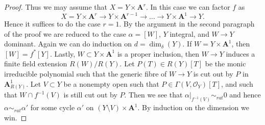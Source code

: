 \documentclass{amsart}
\theoremstyle{plain}
\theoremstyle{definition}
\theoremstyle{remark}
\numberwithin{equation}{subsection}
\begin{document}
\begin{proof}
\medskip\noindent
Thus we may assume that $X = Y \times \mathbf{A}^r$.
In this case we can factor $f$ as
$$
X = Y \times \mathbf{A}^r \to
Y \times \mathbf{A}^{r - 1} \to \ldots \to
Y \times \mathbf{A}^1 \to Y.
$$
Hence it suffices to do the case $r = 1$. By the argument in the
second paragraph of the proof we are reduced to the case
$\alpha = [W]$, $Y$ integral, and $W \to Y$ dominant.
Again we can do induction on $d = \dim_\delta(Y)$.
If $W = Y \times \mathbf{A}^1$, then $[W] = f^*[Y]$.
Lastly, $W \subset Y \times \mathbf{A}^1$ is a proper inclusion,
then $W \to Y$ induces a finite field extension $R(W)/R(Y)$.
Let $P(T) \in R(Y)[T]$ be the monic irreducible polynomial such
that the generic fibre of $W \to Y$ is cut out by $P$ in
$\mathbf{A}^1_{R(Y)}$. Let $V \subset Y$ be a nonempty open such
that $P \in \Gamma(V, \mathcal{O}_Y)[T]$, and such that
$W \cap f^{-1}(V)$ is still cut out by $P$. Then we see that
$\alpha|_{f^{-1}(V)} \sim_{rat} 0$ and hence $\alpha \sim_{rat} \alpha'$
for some cycle $\alpha'$ on $(Y \setminus V) \times \mathbf{A}^1$.
By induction on the dimension we win.
\end{proof}
\end{document}
